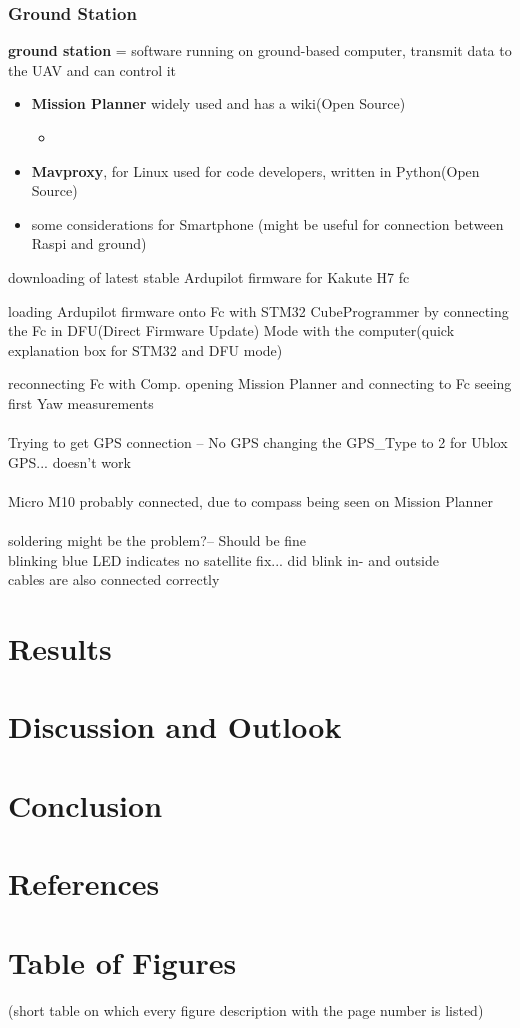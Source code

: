 \documentclass{article}
\begin{document}
	\subsubsection{Ground Station}
	\textbf{ground station} = software running on ground-based computer, transmit data to the UAV and can control it
	\begin{itemize}
		\item \textbf{Mission Planner} widely used and has a wiki(Open Source)
		\begin{itemize}
			\item 
		\end{itemize}
		\item \textbf{Mavproxy}, for Linux used for code developers, written in Python(Open Source)
		\item some considerations for Smartphone (might be useful for connection between Raspi and ground)
	\end{itemize}
	downloading of latest stable Ardupilot firmware for Kakute H7 fc	
	
	loading Ardupilot firmware onto Fc with STM32 CubeProgrammer by connecting the Fc in DFU(Direct Firmware Update) Mode with the computer(quick explanation box for STM32 and DFU mode)
	
	reconnecting Fc with Comp. 
	opening Mission Planner and connecting to Fc seeing first Yaw measurements 
	\\
	\\ Trying to get GPS connection -- No GPS
	changing the GPS\_Type to 2 for Ublox GPS... doesn't work
	\\
	\\ Micro M10 probably connected, due to compass being seen on Mission Planner
	\\
	\\ soldering might be the problem?-- Should be fine
	\\ blinking blue LED indicates no satellite fix... did blink in- and outside
	\\ cables are also connected correctly
	
	\section{Results}
	\section{Discussion and Outlook}
	\section{Conclusion}
	
	\section{References}
	\printbibliography[
	heading=bibintoc,
	title={Bibliography}
	]	
	\section{Table of Figures}
	(short table on which every figure description with the page number is listed)
\end{document}
